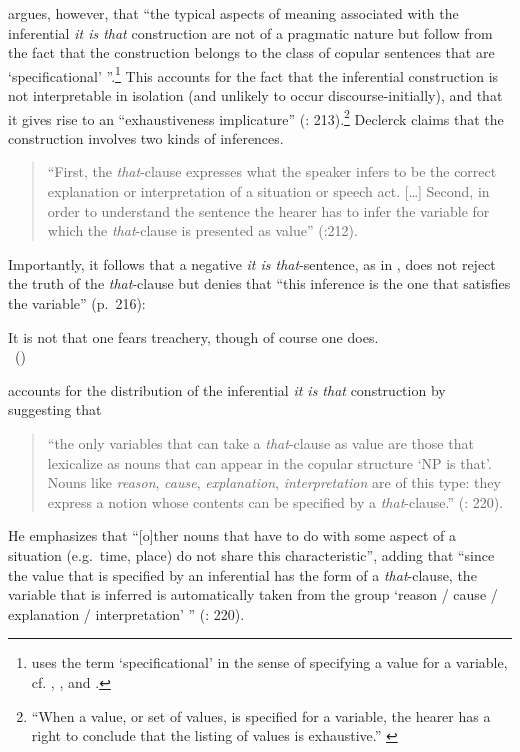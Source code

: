 \documentclass[output=paper,colorlinks,citecolor=brown]{langscibook}
\begin{document}
	\citet[205]{declerck1992} argues, however, that ``the typical aspects of meaning associated with the inferential \textit{it is that} construction are not of a pragmatic nature but follow from the fact that the
	construction belongs to the class of copular sentences that are `specificational' ''.\footnote{\citet{declerck1992} uses the term `specificational' in the sense of specifying a value for a variable, cf. \citet{higgins1976}, \citet{akmajian1979}, and \citet{Declerck1979}.} This accounts for the fact that the inferential construction is not interpretable in isolation (and unlikely to occur discourse-initially), and  that it gives rise to an ``exhaustiveness implicature'' (\citealt{declerck1992}: 213).\footnote{``When a value, or set of values, is specified for a variable, the hearer has a right to conclude that the listing of values is exhaustive.'' \citep[213]{declerck1992}} 
	Declerck claims that the construction involves two kinds of inferences. 
    \begin{quote}
    ``First, the \textit{that}-clause expresses what the speaker infers to be the correct explanation or interpretation of a situation or speech act. [\dots] Second, in order to understand the sentence the hearer has to infer the variable for which the \textit{that}-clause is presented as value'' (\citealt{declerck1992}:212). 
    \end{quote}
    Importantly, it follows that a negative \textit{it is that}-sentence, as in  , does not reject the truth of the \textit{that}-clause but denies that ``this inference is the one that satisfies the variable'' (p.~216):
	
	\ea\label{ex:treachery} It is not that one fears treachery, though of course one does. \\\ \hspace{7cm}(\citealt[216, (22a)]{declerck1992})
	\z
	
		
	\citet{declerck1992} accounts for the distribution of the inferential \textit{it is that} construction by suggesting that 
    \begin{quote}
    ``the only variables that can take a \textit{that}-clause as value are those that lexicalize as nouns that can appear in the copular structure `NP is that'. Nouns like \textit{reason}, \textit{cause}, \textit{explanation}, \textit{interpretation} are of this type: they express a notion whose contents can be specified by a \textit{that}-clause.'' (\citealt{declerck1992}: 220).
    \end{quote}
    He emphasizes that ``[o]ther nouns that have to do with some aspect of a situation (e.g.~time, place) do not share this characteristic'', adding that ``since the value that is specified by an inferential has the form of a \textit{that}-clause, the variable that is inferred is automatically taken from the group `reason / cause / explanation / interpretation' '' (\citealt{declerck1992}: 220). 
	
\end{document}
